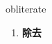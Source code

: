 
\begin{frame}
{\huge obliterate}
\begin{center}
\begin{enumerate}\Large
  \item \textbf{除去}
\end{enumerate}
\end{center}
\end{frame}
